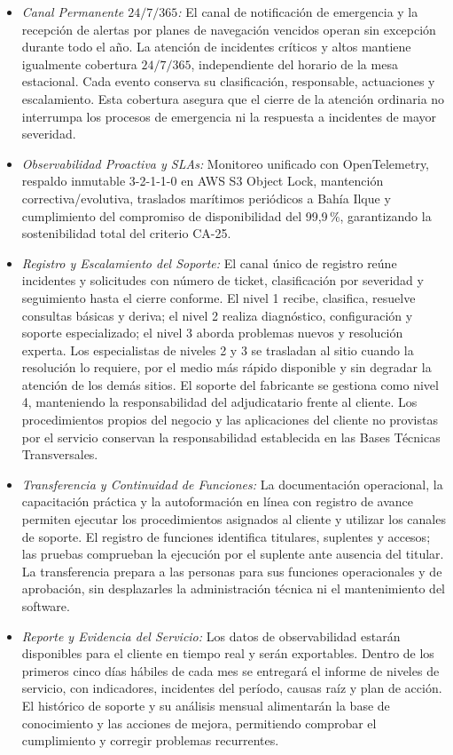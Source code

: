\begin{itemize}
\begin{itemize}
        \item \emph{Canal Permanente $24/7/365$:} El canal de notificación de emergencia y la recepción de alertas por planes de navegación vencidos operan sin excepción durante todo el año. La atención de incidentes críticos y altos mantiene igualmente cobertura $24/7/365$, independiente del horario de la mesa estacional. Cada evento conserva su clasificación, responsable, actuaciones y escalamiento. Esta cobertura asegura que el cierre de la atención ordinaria no interrumpa los procesos de emergencia ni la respuesta a incidentes de mayor severidad.
        \item \emph{Observabilidad Proactiva y SLAs:} Monitoreo unificado con OpenTelemetry, respaldo inmutable 3-2-1-1-0 en AWS S3 Object Lock, mantención correctiva/evolutiva, traslados marítimos periódicos a Bahía Ilque y cumplimiento del compromiso de disponibilidad del 99,9\,\%, garantizando la sostenibilidad total del criterio CA-25.
        \item \emph{Registro y Escalamiento del Soporte:} El canal único de registro reúne incidentes y solicitudes con número de ticket, clasificación por severidad y seguimiento hasta el cierre conforme. El nivel 1 recibe, clasifica, resuelve consultas básicas y deriva; el nivel 2 realiza diagnóstico, configuración y soporte especializado; el nivel 3 aborda problemas nuevos y resolución experta. Los especialistas de niveles 2 y 3 se trasladan al sitio cuando la resolución lo requiere, por el medio más rápido disponible y sin degradar la atención de los demás sitios. El soporte del fabricante se gestiona como nivel 4, manteniendo la responsabilidad del adjudicatario frente al cliente. Los procedimientos propios del negocio y las aplicaciones del cliente no provistas por el servicio conservan la responsabilidad establecida en las Bases Técnicas Transversales.
        \item \emph{Transferencia y Continuidad de Funciones:} La documentación operacional, la capacitación práctica y la autoformación en línea con registro de avance permiten ejecutar los procedimientos asignados al cliente y utilizar los canales de soporte. El registro de funciones identifica titulares, suplentes y accesos; las pruebas comprueban la ejecución por el suplente ante ausencia del titular. La transferencia prepara a las personas para sus funciones operacionales y de aprobación, sin desplazarles la administración técnica ni el mantenimiento del software.
        \item \emph{Reporte y Evidencia del Servicio:} Los datos de observabilidad estarán disponibles para el cliente en tiempo real y serán exportables. Dentro de los primeros cinco días hábiles de cada mes se entregará el informe de niveles de servicio, con indicadores, incidentes del período, causas raíz y plan de acción. El histórico de soporte y su análisis mensual alimentarán la base de conocimiento y las acciones de mejora, permitiendo comprobar el cumplimiento y corregir problemas recurrentes.
    \end{itemize}


\end{itemize}
